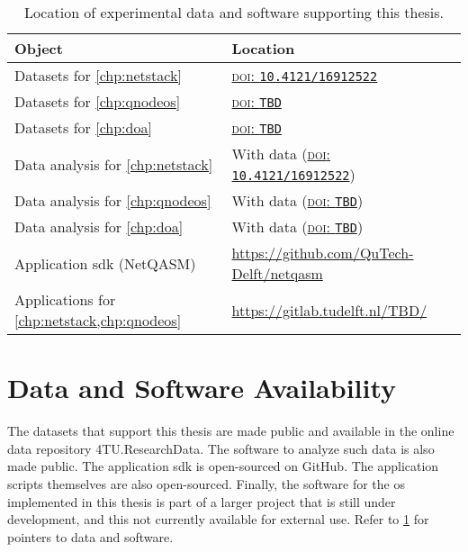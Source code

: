 \begin{table}[t]
    \centering
    \begin{tabularx}{\linewidth}{lX}
        \toprule
        \textbf{Object}                                  & \textbf{Location}                                                                            \\
        \midrule
        Datasets for \cref{chp:netstack}                 & \href{https://doi.org/10.4121/16912522}{\textsc{doi}: \texttt{10.4121/16912522}}             \\
        Datasets for \cref{chp:qnodeos}                  & \href{https://doi.org/xx.xxxx/xxxxxxxx}{\textsc{doi}: \texttt{TBD}}                          \\
        Datasets for \cref{chp:doa}                      & \href{https://doi.org/yy.yyyy/yyyyyyyy}{\textsc{doi}: \texttt{TBD}}                          \\
        Data analysis for \cref{chp:netstack}            & With data (\href{https://doi.org/10.4121/16912522}{\textsc{doi}: \texttt{10.4121/16912522}}) \\
        Data analysis for \cref{chp:qnodeos}             & With data (\href{https://doi.org/xx.xxxx/xxxxxxxx}{\textsc{doi}: \texttt{TBD}})              \\
        Data analysis for \cref{chp:doa}                 & With data (\href{https://doi.org/yy.yyyy/yyyyyyyy}{\textsc{doi}: \texttt{TBD}})              \\
        Application \acrshort{sdk} (NetQASM)             & \url{https://github.com/QuTech-Delft/netqasm}                                                \\
        Applications for \cref{chp:netstack,chp:qnodeos} & \url{https://gitlab.tudelft.nl/TBD/}                                                         \\
        \bottomrule
    \end{tabularx}
    \caption{
        Location of experimental data and software supporting this thesis.
    }
    \label{tab:data-and-soft}
\end{table}

\section{Data and Software Availability}

The datasets that support this thesis are made public and available in the online data repository
4TU.ResearchData. The software to analyze such data is also made public. The application
\acrfull{sdk} is open-sourced on GitHub. The application scripts themselves are also open-sourced.
Finally, the software for the \acrlong{os} implemented in this thesis is part of a larger project
that is still under development, and this not currently available for external use. Refer to
\cref{tab:data-and-soft} for pointers to data and software.

